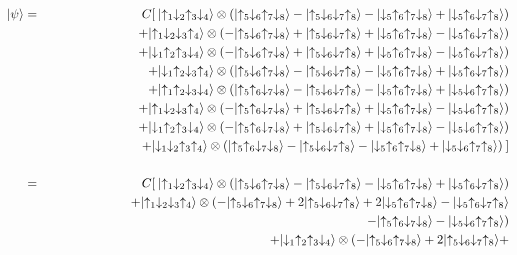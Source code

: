 \begin{eqnarray*}
 \ket{\psi}	   
	     	&=& C[ \: \ket{\up_1\dw_2\up_3\dw_4} \ox 
	     		\left(\ket{\up_5\dw_6\up_7\dw_8} - \ket{\up_5\dw_6\dw_7\up_8} -
	              	\ket{\dw_5\up_6\up_7\dw_8} + \ket{\dw_5\up_6\dw_7\up_8}\right)  \\
		&& \: + \ket{\up_1\dw_2\dw_3\up_4} \ox
			\left(-\ket{\up_5\dw_6\up_7\dw_8} + \ket{\up_5\dw_6\dw_7\up_8} +
	              	\ket{\dw_5\up_6\up_7\dw_8} - \ket{\dw_5\up_6\dw_7\up_8}\right)  \\
		&& \: + \ket{\dw_1\up_2\up_3\dw_4} \ox
			\left(-\ket{\up_5\dw_6\up_7\dw_8} + \ket{\up_5\dw_6\dw_7\up_8} +
	              	\ket{\dw_5\up_6\up_7\dw_8} - \ket{\dw_5\up_6\dw_7\up_8}\right)  \\
		&& \: + \ket{\dw_1\up_2\dw_3\up_4} \ox
			\left(\ket{\up_5\dw_6\up_7\dw_8} - \ket{\up_5\dw_6\dw_7\up_8} -
			\ket{\dw_5\up_6\up_7\dw_8} + \ket{\dw_5\up_6\dw_7\up_8}\right) \\
		&& \: + \ket{\up_1\up_2\dw_3\dw_4} \ox
			\left(\ket{\up_5\up_6\dw_7\dw_8} - \ket{\up_5\dw_6\dw_7\up_8} -
			\ket{\dw_5\up_6\up_7\dw_8} + \ket{\dw_5\dw_6\up_7\up_8}\right) \\
		&& \: + \ket{\up_1\dw_2\dw_3\up_4} \ox
			\left(-\ket{\up_5\up_6\dw_7\dw_8} + \ket{\up_5\dw_6\dw_7\up_8} +
			\ket{\dw_5\up_6\up_7\dw_8} - \ket{\dw_5\dw_6\up_7\up_8}\right) \\
		&& \: + \ket{\dw_1\up_2\up_3\dw_4} \ox
			\left(-\ket{\up_5\up_6\dw_7\dw_8} + \ket{\up_5\dw_6\dw_7\up_8} +
			\ket{\dw_5\up_6\up_7\dw_8} - \ket{\dw_5\dw_6\up_7\up_8}\right)\\
		&& \: + \ket{\dw_1\dw_2\up_3\up_4} \ox
			\left(\ket{\up_5\up_6\dw_7\dw_8} - \ket{\up_5\dw_6\dw_7\up_8} -
			\ket{\dw_5\up_6\up_7\dw_8} + \ket{\dw_5\dw_6\up_7\up_8}\right)\:] \\ \\			
	     &=& C[ \: \ket{\up_1\dw_2\up_3\dw_4} \ox 
	     		\left(\ket{\up_5\dw_6\up_7\dw_8} - \ket{\up_5\dw_6\dw_7\up_8} -
	              	\ket{\dw_5\up_6\up_7\dw_8} + \ket{\dw_5\up_6\dw_7\up_8}\right)  \\
		&& \: + \ket{\up_1\dw_2\dw_3\up_4} \ox
			(-\ket{\up_5\dw_6\up_7\dw_8} + 2\ket{\up_5\dw_6\dw_7\up_8} +
	             	 2\ket{\dw_5\up_6\up_7\dw_8} - \ket{\dw_5\up_6\dw_7\up_8} \\
		 && \hspace{3.5in}
		 	-\ket{\up_5\up_6\dw_7\dw_8} - \ket{\dw_5\dw_6\up_7\up_8}) \\
		&& \: + \ket{\dw_1\up_2\up_3\dw_4} \ox
			(-\ket{\up_5\dw_6\up_7\dw_8} + 2\ket{\up_5\dw_6\dw_7\up_8} +

\end{eqnarray*}
